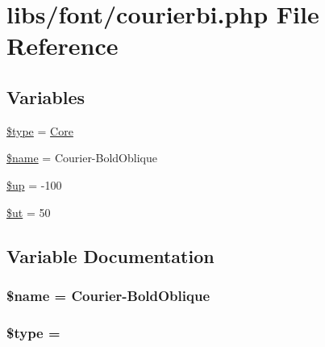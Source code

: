 \hypertarget{courierbi_8php}{}\section{libs/font/courierbi.php File Reference}
\label{courierbi_8php}
\subsection*{Variables}
\begin{DoxyCompactItemize}
\item 
\hyperlink{courierbi_8php_a9a4a6fba2208984cabb3afacadf33919}{\$type} = \textquotesingle{}\hyperlink{class_core}{Core}\textquotesingle{}
\item 
\hyperlink{courierbi_8php_ab2fc40d43824ea3e1ce5d86dee0d763b}{\$name} = \textquotesingle{}Courier-\/Bold\+Oblique\textquotesingle{}
\item 
\hyperlink{courierbi_8php_a6b5ad2ac55f9df46e8f34e78fbd6f176}{\$up} = -\/100
\item 
\hyperlink{courierbi_8php_aadd3f841051043ee58e587e840e8dd0b}{\$ut} = 50
\end{DoxyCompactItemize}


\subsection{Variable Documentation}
\hypertarget{courierbi_8php_ab2fc40d43824ea3e1ce5d86dee0d763b}{}
\subsubsection[{\$name}]{\setlength{\rightskip}{0pt plus 5cm}\$name = \textquotesingle{}Courier-\/Bold\+Oblique\textquotesingle{}}\label{courierbi_8php_ab2fc40d43824ea3e1ce5d86dee0d763b}
\hypertarget{courierbi_8php_a9a4a6fba2208984cabb3afacadf33919}{}
\subsubsection[{\$type}]{\setlength{\rightskip}{0pt plus 5cm}\$type = \textquotesingle{}}\label{courierbi_8php_a9a4a6fba2208984cabb3afacadf33919}
\hypertarget{courierbi_8php_a6b5ad2ac55f9df46e8f34e78fbd6f176}{}
